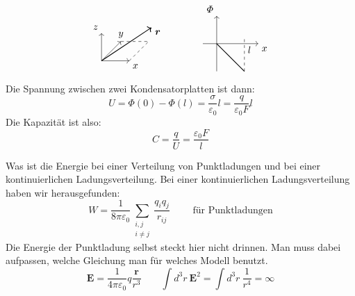 \documentclass[titlepage,11pt,a4paper,ngerman]{report}
\renewcommand{\Phi}{\varPhi}
\newcommand{\kq}{\frac{1}{4\pi\epsilon_0}}
\renewcommand{\vec}[1]{\boldsymbol{#1}}
\newcommand{\lcom}[1]{\color{MidnightBlue}#1\color{black}}
\renewcommand{\epsilon}{\varepsilon}
\begin{document}
$$
\begin{tikzpicture}
\draw[->] (0,0) -- (0,1) node[anchor=south east] {$ z $};
\draw[->] (0,0) -- (.7,.7) node[anchor=south] {$ y $};
\draw[->] (0,0) -- (1,0) node[anchor=north west] {$ x $};
\draw[dashed] (.7,.7) -- (.7+1,.7);
\draw[dashed] (1,0) -- (1+.7,.7);
\draw[thick,->] (0,0) -- (1.8,1.2) node[right,yshift=-5pt] {$ \vec{r} $};
\end{tikzpicture}
\qquad \qquad 
\begin{tikzpicture}
\draw[->] (-.5,0) -- (1.5,0) node[anchor=north west] {$ x $};
\draw[->] (0,-1) -- (0,1) node[anchor=south east] {$ \Phi $};
\draw[thick] (0,0) -- (1,-1);
\draw[dashed] (1,-1) -- (1,.2) node[anchor=north west,yshift=-5pt] {$ l $};
\end{tikzpicture}
$$

\noindent
Die Spannung zwischen zwei Kondensatorplatten ist dann:
\begin{equation*}
U = \Phi(0) - \Phi(l) = \frac{\sigma}{\epsilon_0} l = \frac{q}{\epsilon_0 F} l
\end{equation*}
Die Kapazität ist also:
\begin{equation*}
C = \frac{q}{U} = \frac{\epsilon_0 F}{l}
\end{equation*}

\noindent
\lcom{Was ist die Energie bei einer Verteilung von Punktladungen und bei einer kontinuierlichen Ladungsverteilung. Bei einer kontinuierlichen Ladungsverteilung haben wir herausgefunden:}
$$W = \frac{1}{8 \pi \epsilon_0} \sum_{\substack{i,j\\ i \neq j}} \frac{q_i q_j}{r_{ij}} \qquad \textrm{ für Punktladungen}$$
\lcom{Die Energie der Punktladung selbst steckt hier nicht drinnen. Man muss dabei aufpassen, welche Gleichung man für welches Modell benutzt.}
$$\vec{E} = \kq q \frac{\vec{r}}{r^3} \qquad \int d^3 r\ \vec{E}^2 = \int d^3 r\ \frac{1}{r^4} = \infty$$
\end{document}
